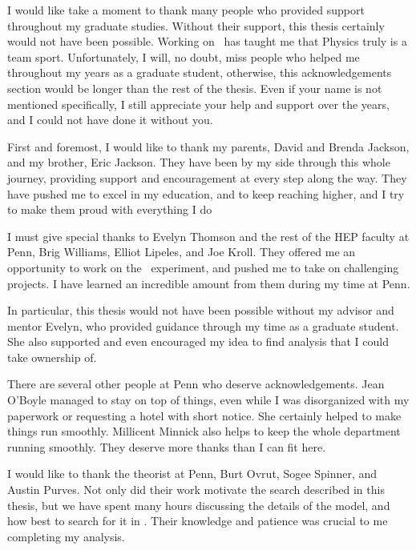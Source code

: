 
I would like take a moment to thank many people who provided support throughout
my graduate studies.
Without their support, this thesis certainly would not have been possible.
Working on \atlas\ has taught me that Physics truly is a team sport.
Unfortunately, I will, no doubt, miss people who helped me throughout my years
as a graduate student, otherwise, this acknowledgements section would be longer
than the rest of the thesis.
Even if your name is not mentioned specifically, I still appreciate your
help and support over the years, and I could not have done it without you.

First and foremost, I would like to thank my parents, David and Brenda Jackson,
and my brother, Eric Jackson.
They have been by my side through this whole journey, providing support and
encouragement at every step along the way.
They have pushed me to excel in my education, and to keep reaching higher, and
I try to make them proud with everything I do

I must give special thanks to Evelyn Thomson and the rest of the HEP faculty
at Penn,
Brig Williams,
Elliot Lipeles,
and Joe Kroll.
They offered me an opportunity to work on the \atlas\ experiment, and
pushed me to take on challenging projects.
I have learned an incredible amount from them during my time at Penn.

In particular, this thesis would not have been possible without my advisor
and mentor Evelyn, who provided guidance through my time as a graduate
student.
She also supported and even encouraged my idea to find analysis that I could
take ownership of.

There are several other people at Penn who deserve acknowledgements.
Jean O'Boyle managed to stay on top of things, even while I was disorganized
with my paperwork or requesting a hotel with short notice.
She certainly helped to make things run smoothly.
Millicent Minnick also helps to keep the whole department running smoothly.
They deserve more thanks than I can fit here.

I would like to thank the theorist at Penn, 
Burt Ovrut,
Sogee Spinner,
and Austin Purves.
Not only did their work motivate the search described in this thesis, but
we have spent many hours discussing the details of the model, and how best to
search for it in \atlas.
Their knowledge and patience was crucial to me completing my analysis.

